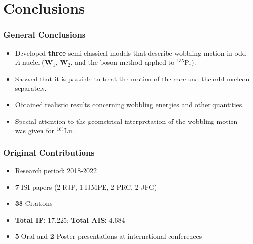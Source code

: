 \documentclass{beamer}
\begin{document}
\section{Conclusions}

\begin{frame}
	\frametitle{General Conclusions}
	\begin{itemize}
		\item Developed \textbf{three} semi-classical models that describe wobbling motion in odd-$A$ nuclei ($\mathbf{W}_1$, $\mathbf{W}_2$, and the boson method applied to $^{135}$Pr).
		\item Showed that it is possible to treat the motion of the core and the odd nucleon separately.
		\item Obtained realistic results concerning wobbling energies and other quantities.
		\item Special attention to the geometrical interpretation of the wobbling motion was given for $^{163}$Lu.
	\end{itemize}
\end{frame}


\begin{frame}
	\frametitle{Original Contributions}
	\begin{itemize}
		\item Research period: 2018-2022
		\item \textbf{7} ISI papers (2 RJP, 1 IJMPE, 2 PRC, 2 JPG)
		\item \textbf{38} Citations
		\item \textbf{Total IF:} 17.225; \textbf{Total AIS:} 4.684
		\item \textbf{5} Oral and \textbf{2} Poster presentations at international conferences
	\end{itemize}
\end{frame}

\end{document}
